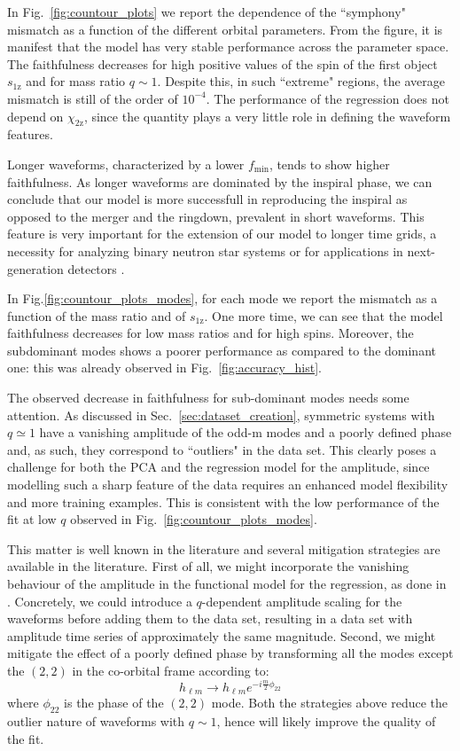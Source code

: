 \documentclass[twocolumn,showpacs,preprintnumbers,nofootinbib,prd,
superscriptaddress,10pt]{revtex4-2}
\begin{document}
In Fig.~\ref{fig:countour_plots} we report the dependence of the ``symphony" mismatch as a function of the different orbital parameters.
From the figure, it is manifest that the model has very stable performance across the parameter space.
The faithfulness decreases for high positive values of the spin of the first object $s_\text{1z}$ and for mass ratio $q\sim 1$. Despite this, in such ``extreme" regions, the average mismatch is still of the order of $10^{-4}$.
The performance of the regression does not depend on $\chi_\text{2z}$, since the quantity plays a very little role in defining the waveform features.

Longer waveforms, characterized by a lower $f_\textrm{min}$, tends to show higher faithfulness. As longer waveforms are dominated by the inspiral phase, we can conclude that our model is more successfull in reproducing the inspiral as opposed to the merger and the ringdown, prevalent in short waveforms.
This feature is very important for the extension of our model to longer time grids, a necessity for analyzing binary neutron star systems or for applications in next-generation detectors \cite{Purrer:2019jcp}.

In Fig.\ref{fig:countour_plots_modes}, for each mode we report the mismatch as a function of the mass ratio and of $s_\text{1z}$. One more time, we can see that the model faithfulness decreases for low mass ratios and for high spins. Moreover, the subdominant modes shows a poorer performance as compared to the dominant one: this was already observed in Fig.~\ref{fig:accuracy_hist}.

The observed decrease in faithfulness for sub-dominant modes needs some attention.
As discussed in Sec.~\ref{sec:dataset_creation}, symmetric systems with $q \simeq 1$ have a vanishing amplitude of the odd-m modes and a poorly defined phase and, as such, they correspond to ``outliers" in the data set. This clearly poses a challenge for both the PCA and the regression model for the amplitude, since modelling such a sharp feature of the data requires an enhanced model flexibility and more training examples.
This is consistent with the low performance of the fit at low $q$ observed in Fig.~\ref{fig:countour_plots_modes}.

This matter is well known in the literature and several mitigation strategies are available in the literature.
First of all, we might incorporate the vanishing behaviour of the amplitude in the functional model for the regression, as done in \cite{Blackman:2015pia}. Concretely, we could introduce a $q$-dependent amplitude scaling for the waveforms before adding them to the data set, resulting in a data set with amplitude time series of approximately the same magnitude.
Second, we might mitigate the effect of a poorly defined phase by transforming all the modes except the $(2,2)$ in the co-orbital frame \cite{Varma:2018mmi} according to:
\begin{equation}
	h_{\ell m} \rightarrow h_{\ell m} e^{-i\frac{m}{2}\phi_{22}}
\end{equation}
where $\phi_{22}$ is the phase of the $(2,2)$ mode.
Both the strategies above reduce the outlier nature of waveforms with $q \sim 1$, hence will likely improve the quality of the fit.
\end{document}
